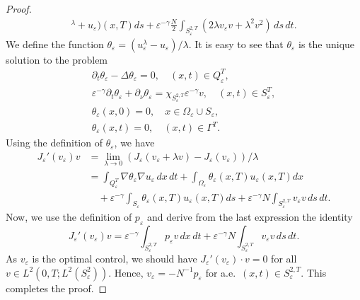 \documentclass[10pt,a4paper]{amsart}
\numberwithin{equation}{section}
\begin{document}
\begin{proof}
\begin{align*}
{ }^{\lambda }+u_{\varepsilon })(x,T){ds}+\varepsilon ^{-\gamma }\frac{N}{2}%
 \int _{S _{\varepsilon }^{2, T}}(2\lambda v_{\varepsilon }v+\lambda
^2v^2)\,ds\,dt.
\end{align*}
We define the function $\theta _{\varepsilon }=(u_{\varepsilon }^{\lambda
}-u_{\varepsilon })/\lambda $. 
It is easy to see that $\theta _{\varepsilon } $ is the unique solution to the problem
\begin{gather*}
\partial _{t}\theta _{\varepsilon }-\Delta \theta _{\varepsilon }=0, \quad
(x,t)\in Q_{\varepsilon }^{T}, \\
\varepsilon ^{-\gamma }\partial _{t}\theta _{\varepsilon }+\partial _{\nu
}\theta _{\varepsilon }=\chi _{S_{\varepsilon }^{2,T}}\varepsilon ^{-\gamma
}v, \quad (x,t)\in S_{\varepsilon }^{T}, \\
\theta _{\varepsilon }(x,0)=0, \quad  x\in \Omega _{\varepsilon }\cup
S_{\varepsilon }, \\
\theta _{\varepsilon }(x,t)=0, \quad (x,t)\in \Gamma ^{T}.%
\end{gather*}
Using the definition of $\theta _{\varepsilon }$, we have
\begin{align*}
J_{\varepsilon }'(v_{\varepsilon })v
&=\lim _{\lambda \to 0}(J_{\varepsilon }(v_{\varepsilon }+\lambda v)-J_{\varepsilon
 }(v_{\varepsilon }))/\lambda  \\
&=\int _{Q_{\varepsilon }^{T}}\nabla \theta _{\varepsilon }\nabla
u_{\varepsilon }\,dx\,dt+\int _{\Omega _{\varepsilon }}\theta
_{\varepsilon }(x,T)u_{\varepsilon }(x,T){dx} \\
&\quad +\varepsilon ^{-\gamma }\int _{S_{\varepsilon }}\theta _{\varepsilon
}(x,T)u_{\varepsilon }(x,T){ds}+\varepsilon ^{-\gamma }N\int
_{S_{\varepsilon }^{2,T}}v_{\varepsilon }v\,ds\,dt.
\end{align*}
Now, we use the definition of $p_{\varepsilon }$ and derive from the last
expression the identity
\[
J_{\varepsilon }'(v_{\varepsilon })v=\varepsilon ^{-\gamma }\int
_{S_{\varepsilon }^{2,T}}p_{\varepsilon }v\,dx\,dt+\varepsilon
^{-\gamma }N\int _{S_{\varepsilon }^{2,T}}v_{\varepsilon }v\,ds\,dt.
\]
As $v_{\varepsilon }$ is the optimal control, we should have
$J_{\varepsilon}'(v_{\varepsilon })\cdot v=0$ for all
$v\in L^2(0,T;L^2(S_{\varepsilon }^2))$. Hence,
$v_{\varepsilon }=-N^{-1}p_{\varepsilon }$ for a.e.\
 $(x,t)\in S_{\varepsilon }^{2,T}$. This
completes the proof.
\end{proof}
\end{document}
